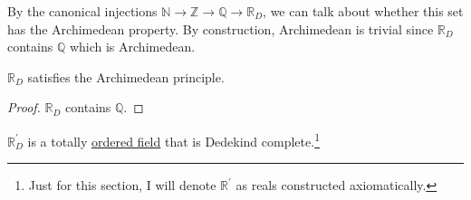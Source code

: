   By the canonical injections $\mathbb{N} \rightarrow \mathbb{Z} \rightarrow \mathbb{Q} \rightarrow \mathbb{R}_D$, we can talk about whether this set has the Archimedean property. By construction, Archimedean is trivial since $\mathbb{R}_D$ contains $\mathbb{Q}$ which is Archimedean. 

  \begin{theorem}
    \label{thm:dedekind-reals-is-archimedean}
    $\mathbb{R}_D$ satisfies the Archimedean principle. 
  \end{theorem}
  \begin{proof} 
    $\mathbb{R}_D$ contains $\mathbb{Q}$. 
  \end{proof}

  \begin{definition}
    \label{def:axiomatic-construction-of-dedekind-reals}
    $\mathbb{R}_D^\prime$ is a totally \hyperref[alg-def:ordered-field]{ordered field} that is Dedekind complete.\footnote{Just for this section, I will denote $\mathbb{R}^\prime$ as reals constructed axiomatically.}
  \end{definition}

